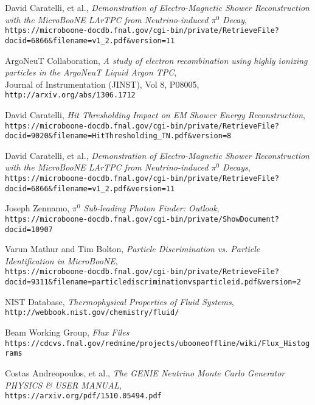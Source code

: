 \begin{thebibliography}{20}
  David Caratelli, et al., \emph{Demonstration of Electro-Magnetic Shower Reconstruction with the MicroBooNE LArTPC from Neutrino-induced $\pi^0$ Decay},\\
\texttt{https://microboone-docdb.fnal.gov/cgi-bin/private/RetrieveFile?docid=6866\&filename=v1\_2.pdf\&version=11}
  
  ArgoNeuT Collaboration, \emph{A study of electron recombination using highly ionizing particles in the ArgoNeuT Liquid Argon TPC},\\
  Journal of Instrumentation (JINST), Vol 8, P08005, \texttt{http://arxiv.org/abs/1306.1712}
  
  David Caratelli, \emph{Hit Thresholding Impact on EM Shower Energy Reconstruction},\\
  \texttt{https://microboone-docdb.fnal.gov/cgi-bin/private/RetrieveFile?docid=9020\&filename=HitThresholding\_TN.pdf\&version=8}

  David Caratelli, et al., \emph{Demonstration of Electro-Magnetic Shower Reconstruction with
the MicroBooNE LArTPC from Neutrino-induced $\pi^0$ Decays},\\
  \texttt{https://microboone-docdb.fnal.gov/cgi-bin/private/RetrieveFile?docid=6866\&filename=v1\_2.pdf\&version=11}
  
  Joseph Zennamo, \emph{$\pi^0$ Sub-leading Photon Finder: Outlook},\\
  \texttt{https://microboone-docdb.fnal.gov/cgi-bin/private/ShowDocument?docid=10907}
 
  
  Varun Mathur and Tim Bolton, \emph{Particle Discrimination vs. Particle Identification in MicroBooNE},\\
  \texttt{https://microboone-docdb.fnal.gov/cgi-bin/private/RetrieveFile?docid=9311\&filename=particlediscriminationvsparticleid.pdf\&version=2}

 NIST Database, \emph{Thermophysical Properties of Fluid Systems},\\
  \texttt{http://webbook.nist.gov/chemistry/fluid/}

  Beam Working Group, \emph{Flux Files}\\
  \texttt{https://cdcvs.fnal.gov/redmine/projects/ubooneoffline/wiki/Flux\_Histograms}

  Costas Andreopoulos, et al., \emph{The GENIE Neutrino Monte Carlo Generator PHYSICS \& USER MANUAL},\\
  \texttt{https://arxiv.org/pdf/1510.05494.pdf}


\end{thebibliography}
